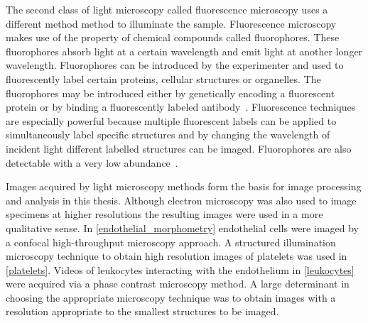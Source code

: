 The second class of light microscopy called fluorescence microscopy uses a different method method to illuminate the sample. Fluorescence microscopy makes use of the property of chemical compounds called fluorophores. These fluorophores absorb light at a certain wavelength and emit light at another longer wavelength. Fluorophores can be introduced by the experimenter and used to fluorescently label certain proteins, cellular structures or organelles. The fluorophores may be introduced either by genetically encoding a fluorescent protein or by binding a fluorescently labeled antibody~\cite{Thorn2016}. Fluorescence techniques are especially powerful because multiple fluorescent labels can be applied to simultaneously label specific structures and by changing the wavelength of incident light different labelled structures can be imaged. Fluorophores are also detectable with a very low abundance~\cite{Ljosa2009}.

Images acquired by light microscopy methods form the basis for image processing and analysis in this thesis. Although electron microscopy was also used to image specimens at higher resolutions the resulting images were used in a more qualitative sense. In \autoref{endothelial_morphometry} endothelial cells were imaged by a confocal high-throughput microscopy approach. A structured illumination microscopy technique to obtain high resolution images of platelets was used in \autoref{platelets}. Videos of leukocytes interacting with the endothelium in \autoref{leukocytes} were acquired via a phase contrast microscopy method. A large determinant in choosing the appropriate microscopy technique was to obtain images with a resolution appropriate to the smallest structures to be imaged.

